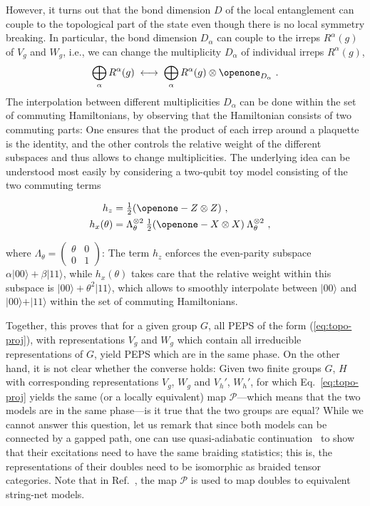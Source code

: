 \documentclass[twocolumn,superscriptaddress,prb,linenumbers]{revtex4-1}
\newcommand{\ket}[1]{\vert#1\rangle}
\newcommand{\mc}[1]{\mathcal{#1}}
\begin{document}
However, it turns out that the bond dimension $D$ of the local
entanglement can couple to the topological part of the state
even though there is no local symmetry breaking.
In particular, the bond dimension $D_\alpha$ can couple to the irreps
$R^\alpha(g)$ of $V_g$ and $W_g$, i.e., we can change the multiplicity
$D_\alpha$ of individual irreps $R^\alpha(g)$,
\[
    \bigoplus_\alpha R^\alpha(g)\;\longleftrightarrow\;
    \bigoplus_\alpha R^\alpha(g)\otimes\openone_{D_\alpha}\ .
\]
The interpolation between different multiplicities ${D_\alpha}$ can be
done within the set of commuting Hamiltonians, by observing that the
Hamiltonian consists of two commuting parts:\cite{schuch:peps-sym} One
ensures that the product of each
irrep around a plaquette is the identity, and the other controls the
relative weight of the different subspaces and thus allows to change
multiplicities. The underlying idea can be understood most easily by
considering a two-qubit toy model consisting of the two commuting terms
\begin{linenomath}
    \begin{align*}
        h_z         & =\tfrac12(\openone-Z\otimes Z)\ , \\
        h_x(\theta) & =
        \Lambda_\theta^{\otimes 2} \:
        \tfrac12(\openone-X\otimes X)\:
        \Lambda_\theta^{\otimes 2}\ ,
        \quad
    \end{align*}
\end{linenomath}
where $\Lambda_\theta=
    \left(\begin{smallmatrix}\theta&0\\0&1\end{smallmatrix}\right)$:
The term $h_z$ enforces the even-parity subspace
$\alpha\ket{00}+\beta\ket{11}$, while $h_x(\theta)$ takes care that the
relative weight within this subspace is $\ket{00}+\theta^2\ket{11}$, which
allows to smoothly interpolate between $\ket{00}$ and $\ket{00}+\ket{11}$
within the set of commuting Hamiltonians.

Together,  this proves that for a given group $G$, all PEPS of the form
(\ref{eq:topo-proj}), with
representations $V_g$ and $W_g$ which contain all irreducible
representations of $G$, yield PEPS which are in the same phase.
On the other hand, it is not clear whether the converse holds:
Given two finite groups $G$, $H$ with corresponding representations $V_g$,
$W_g$ and $V_h'$, $W_h'$, for which Eq.~\eqref{eq:topo-proj} yields the
same (or a locally equivalent) map $\mc P$---which means that the two
models are in the same phase---is it true that
the two groups are equal? While we cannot answer this question, let us
remark that since both models can be connected by a gapped path, one can
use quasi-adiabatic
continuation~\cite{hastings:quasi-adiabatic,bachmann:quasi-adiabatic} to
show that their excitations need to have the same braiding statistics;
this is,
the representations of their doubles need to be isomorphic as braided
tensor categories. Note that in
Ref.~, the map $\mc P$ is
used to map doubles to equivalent string-net models.
\end{document}
